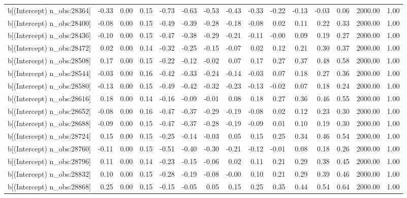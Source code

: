 \begin{table}[ht]
\begin{tabular}{rrrrrrrrrrrrrrr}
  b[(Intercept) n\_obs:28364] & -0.33 & 0.00 & 0.15 & -0.73 & -0.63 & -0.53 & -0.43 & -0.33 & -0.22 & -0.13 & -0.03 & 0.06 & 2000.00 & 1.00 \\ 
  b[(Intercept) n\_obs:28400] & -0.08 & 0.00 & 0.15 & -0.49 & -0.39 & -0.28 & -0.18 & -0.08 & 0.02 & 0.11 & 0.22 & 0.33 & 2000.00 & 1.00 \\ 
  b[(Intercept) n\_obs:28436] & -0.10 & 0.00 & 0.15 & -0.47 & -0.38 & -0.29 & -0.21 & -0.11 & -0.00 & 0.09 & 0.19 & 0.27 & 2000.00 & 1.00 \\ 
  b[(Intercept) n\_obs:28472] & 0.02 & 0.00 & 0.14 & -0.32 & -0.25 & -0.15 & -0.07 & 0.02 & 0.12 & 0.21 & 0.30 & 0.37 & 2000.00 & 1.00 \\ 
  b[(Intercept) n\_obs:28508] & 0.17 & 0.00 & 0.15 & -0.22 & -0.12 & -0.02 & 0.07 & 0.17 & 0.27 & 0.37 & 0.48 & 0.58 & 2000.00 & 1.00 \\ 
  b[(Intercept) n\_obs:28544] & -0.03 & 0.00 & 0.16 & -0.42 & -0.33 & -0.24 & -0.14 & -0.03 & 0.07 & 0.18 & 0.27 & 0.36 & 2000.00 & 1.00 \\ 
  b[(Intercept) n\_obs:28580] & -0.13 & 0.00 & 0.15 & -0.49 & -0.42 & -0.32 & -0.23 & -0.13 & -0.02 & 0.07 & 0.18 & 0.24 & 2000.00 & 1.00 \\ 
  b[(Intercept) n\_obs:28616] & 0.18 & 0.00 & 0.14 & -0.16 & -0.09 & -0.01 & 0.08 & 0.18 & 0.27 & 0.36 & 0.46 & 0.55 & 2000.00 & 1.00 \\ 
  b[(Intercept) n\_obs:28652] & -0.08 & 0.00 & 0.16 & -0.47 & -0.37 & -0.29 & -0.19 & -0.08 & 0.02 & 0.12 & 0.23 & 0.30 & 2000.00 & 1.00 \\ 
  b[(Intercept) n\_obs:28688] & -0.09 & 0.00 & 0.15 & -0.47 & -0.37 & -0.28 & -0.19 & -0.09 & 0.01 & 0.10 & 0.19 & 0.30 & 2000.00 & 1.00 \\ 
  b[(Intercept) n\_obs:28724] & 0.15 & 0.00 & 0.15 & -0.25 & -0.14 & -0.03 & 0.05 & 0.15 & 0.25 & 0.34 & 0.46 & 0.54 & 2000.00 & 1.00 \\ 
  b[(Intercept) n\_obs:28760] & -0.11 & 0.00 & 0.15 & -0.51 & -0.40 & -0.30 & -0.21 & -0.12 & -0.01 & 0.08 & 0.18 & 0.26 & 2000.00 & 1.00 \\ 
  b[(Intercept) n\_obs:28796] & 0.11 & 0.00 & 0.14 & -0.23 & -0.15 & -0.06 & 0.02 & 0.11 & 0.21 & 0.29 & 0.38 & 0.45 & 2000.00 & 1.00 \\ 
  b[(Intercept) n\_obs:28832] & 0.10 & 0.00 & 0.15 & -0.28 & -0.19 & -0.08 & -0.00 & 0.10 & 0.21 & 0.29 & 0.39 & 0.46 & 2000.00 & 1.00 \\ 
  b[(Intercept) n\_obs:28868] & 0.25 & 0.00 & 0.15 & -0.15 & -0.05 & 0.05 & 0.15 & 0.25 & 0.35 & 0.44 & 0.54 & 0.64 & 2000.00 & 1.00 \\ 

\end{tabular}
\end{table}
